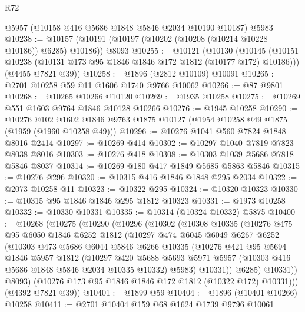 \begin{lexlean}{R72}
\begin{coremodule}
    @5957
    (@10158 @416 @5686 @1848 @5846 @2034 @10190 @10187)
    @5983
@10238 := @10157 (@10191 (@10197 (@10202 (@10208 (@10214 @10228 @10186)) @6285) @10186)) @8093
@10255 := @10121
    (@10130
      (@10145 (@10151 @10238 (@10131 @173 @95 @1846 @1846 @172 @1812 (@10177 @172) @10186)))
      (@4455 @7821 @39))
@10258 := @1896 (@2812 @10109) @10091
@10265 := @2701 @10258 @59 @11 @1606 @1740 @9766 @10062
@10266 := @87 @9801
@10268 := @10265 @10266 @10120
@10269 := @1935 @10258
@10275 := @10269 @551 @1603 @9764 @1846 @10128 @10266
@10276 := @1945 @10258
@10290 := @10276
    @102
    @1602
    @1846
    @9763
    @1875
    @10127
    (@1954 @10258 @49 @1875 (@1959 (@1960 @10258 @49)))
@10296 := @10276 @1041 @560 @7824 @1848 @8016 @2414
@10297 := @10269 @414
@10302 := @10297 @1040 @7819 @7823 @8038 @8016
@10303 := @10276 @418
@10308 := @10303 @1039 @5686 @7818 @5846 @8037
@10314 := @10269 @180 @417 @1849 @5685 @5863 @5846
@10315 := @10276 @296
@10320 := @10315 @416 @1846 @1848 @295 @2034
@10322 := @2073 @10258 @11
@10323 := @10322 @295
@10324 := @10320 @10323
@10330 := @10315 @95 @1846 @1846 @295 @1812 @10323
@10331 := @1973 @10258
@10332 := @10330 @10331
@10335 := @10314 (@10324 @10332) @5875
@10400 := @10268
    (@10275
      (@10290
        (@10296
          (@10302
            (@10308
              @10335
              (@10276
                @475
                @95
                @6050
                @1846
                @6252
                @1812
                (@10297
                  @474
                  @6045
                  @6049
                  @6267
                  @6252
                  (@10303
                    @473
                    @5686
                    @6044
                    @5846
                    @6266
                    @10335
                    (@10276
                      @421
                      @95
                      @5694
                      @1846
                      @5957
                      @1812
                      (@10297
                        @420
                        @5688
                        @5693
                        @5971
                        @5957
                        (@10303 @416 @5686 @1848 @5846 @2034 @10335 @10332)
                        @5983)
                      @10331))
                  @6285)
                @10331))
            @8093)
          (@10276 @173 @95 @1846 @1846 @172 @1812 (@10322 @172) @10331)))
      (@4392 @7821 @39))
@10401 := @1899 @59
@10404 := @1896 (@10401 @10266) @10258
@10411 := @2701 @10404 @159 @68 @1624 @1739 @9796 @10061

\end{coremodule}
\end{lexlean}
